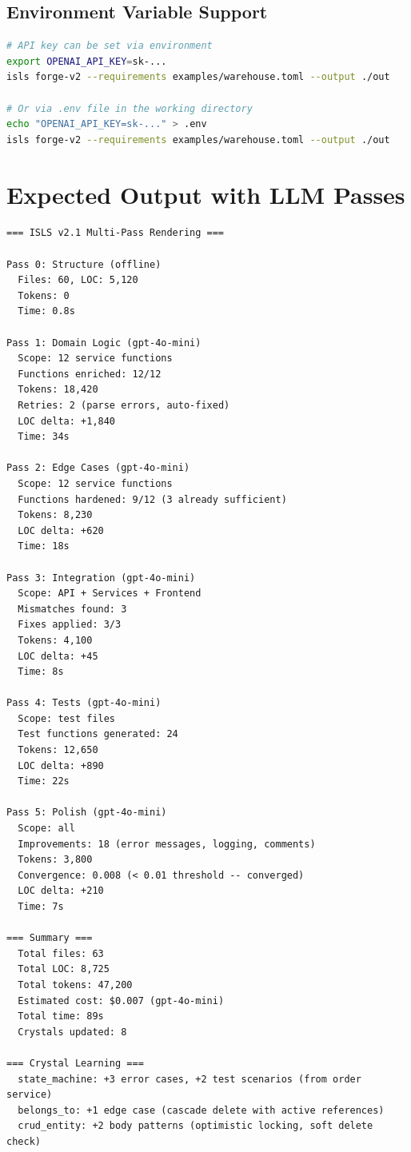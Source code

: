 \documentclass[11pt,a4paper]{article}
\begin{document}
\subsection{Environment Variable Support}

\begin{lstlisting}[language=bash]
# API key can be set via environment
export OPENAI_API_KEY=sk-...
isls forge-v2 --requirements examples/warehouse.toml --output ./out

# Or via .env file in the working directory
echo "OPENAI_API_KEY=sk-..." > .env
isls forge-v2 --requirements examples/warehouse.toml --output ./out
\end{lstlisting}

\section{Expected Output with LLM Passes}

\begin{lstlisting}[title=forge-v2 with --passes 5 --trace]
=== ISLS v2.1 Multi-Pass Rendering ===

Pass 0: Structure (offline)
  Files: 60, LOC: 5,120
  Tokens: 0
  Time: 0.8s

Pass 1: Domain Logic (gpt-4o-mini)
  Scope: 12 service functions
  Functions enriched: 12/12
  Tokens: 18,420
  Retries: 2 (parse errors, auto-fixed)
  LOC delta: +1,840
  Time: 34s

Pass 2: Edge Cases (gpt-4o-mini)
  Scope: 12 service functions
  Functions hardened: 9/12 (3 already sufficient)
  Tokens: 8,230
  LOC delta: +620
  Time: 18s

Pass 3: Integration (gpt-4o-mini)
  Scope: API + Services + Frontend
  Mismatches found: 3
  Fixes applied: 3/3
  Tokens: 4,100
  LOC delta: +45
  Time: 8s

Pass 4: Tests (gpt-4o-mini)
  Scope: test files
  Test functions generated: 24
  Tokens: 12,650
  LOC delta: +890
  Time: 22s

Pass 5: Polish (gpt-4o-mini)
  Scope: all
  Improvements: 18 (error messages, logging, comments)
  Tokens: 3,800
  Convergence: 0.008 (< 0.01 threshold -- converged)
  LOC delta: +210
  Time: 7s

=== Summary ===
  Total files: 63
  Total LOC: 8,725
  Total tokens: 47,200
  Estimated cost: $0.007 (gpt-4o-mini)
  Total time: 89s
  Crystals updated: 8

=== Crystal Learning ===
  state_machine: +3 error cases, +2 test scenarios (from order service)
  belongs_to: +1 edge case (cascade delete with active references)
  crud_entity: +2 body patterns (optimistic locking, soft delete check)
\end{lstlisting}
\end{document}
